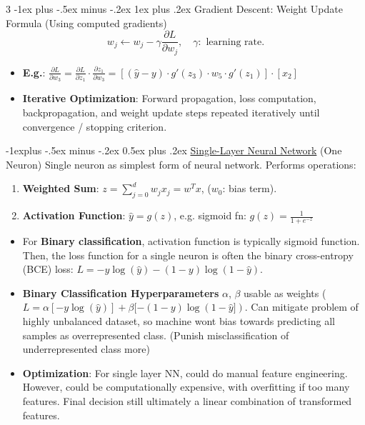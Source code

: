 \documentclass[a4paper, 9pt, landscape]{article}
\makeatletter
\renewcommand{\subsection}{\@startsection{subsection}{2}{0mm}%
                                {-1explus -.5ex minus -.2ex}%
                                {0.5ex plus .2ex}%
                                {\normalfont\normalsize\bfseries}}
\renewcommand{\subsubsection}{\@startsection{subsubsection}{3}{0mm}%
                                {-1ex plus -.5ex minus -.2ex}%
                                {1ex plus .2ex}%
                                {\normalfont\small\bfseries}}
\makeatother
\begin{document}
\begin{multicols*}{3}
\subsubsection{Gradient Descent: Weight Update Formula {\scriptsize (Using computed gradients)}}
$$
w_j \leftarrow w_j - \gamma \frac{\partial L}{\partial w_j}, \quad \gamma : \text{ learning rate.}
$$
\begin{itemize}
\item \textbf{E.g.}: $\frac{\partial L}{\partial w_3} =  \frac{\partial L}{\partial z_1} \cdot \frac{\partial z_1}{\partial w_3} = [ (\hat{y} - y) \cdot g'(z_3) \cdot w_5 \cdot g'(z_1) ] \cdot [ x_2 ]$
\item \textbf{Iterative Optimization}: Forward propagation, loss computation, backpropagation, and weight update steps repeated iteratively until convergence / stopping criterion.
\end{itemize}

\subsection{\underline{Single-Layer Neural Network} (One Neuron)}
Single neuron as simplest form of neural network. Performs operations:
\begin{enumerate}[itemsep=0pt]
    \item \textbf{Weighted Sum}: $z = \sum_{j=0}^d w_j x_j = w^T x$, ($ w_0 $: bias term).
    \item \textbf{Activation Function}: $\hat{y} = g(z)$, e.g. sigmoid fn: $g(z) = \frac{1}{1 + e^{-z}}$
\end{enumerate}
\begin{itemize}[itemsep=0pt, topsep=0pt]
\item For \textbf{Binary classification}, activation function is typically sigmoid function. Then, the loss function for a single neuron is often the binary cross-entropy (BCE) loss: $L = -y \log(\hat{y}) - (1-y) \log(1-\hat{y}).$
\item \textbf{Binary Classification Hyperparameters} $\alpha$, $\beta$ usable as weights ($L = \alpha[-y \log(\hat{y})] + \beta[-(1-y) \log(1-\hat{y}]).$ Can mitigate problem of highly unbalanced dataset, so machine wont bias towards predicting all samples as overrepresented class. (Punish misclassification of underrepresented class more)
\item \textbf{Optimization}: For single layer NN, could do manual feature engineering. However, could be computationally expensive, with overfitting if too many features. Final decision still ultimately a linear combination of transformed features.
\end{itemize}



\end{multicols*}
\end{document}
